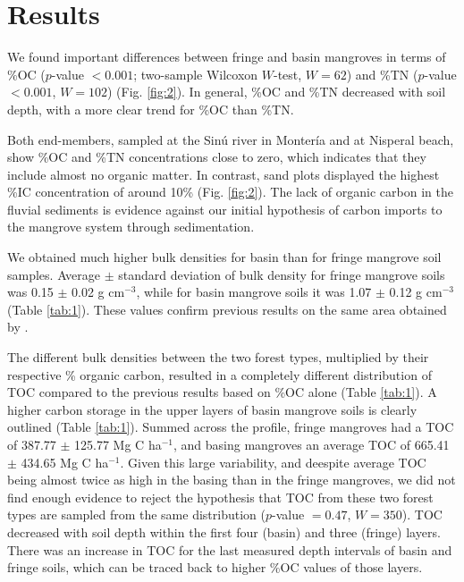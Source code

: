\section{Results}

We found important differences between fringe and basin mangroves in terms of \%OC ($p$-value $< 0.001$; two-sample Wilcoxon $W$-test, $W = 62$) and \%TN ($p$-value $< 0.001$, $W = 102$) (Fig. \ref{fig:2}). In general, \%OC and \%TN decreased with soil depth, with a more clear trend for \%OC than \%TN. 

Both end-members, sampled at the Sin\'{u} river in Monter\'{i}a and at Nisperal beach, show \%OC and \%TN concentrations close to zero, which indicates that they include almost no organic matter. In contrast, sand plots displayed the highest \%IC concentration of around 10\% (Fig. \ref{fig:2}). The lack of organic carbon in the fluvial sediments is evidence against our initial hypothesis of carbon imports to the mangrove system through sedimentation. 

We obtained much higher bulk densities for basin than for fringe mangrove soil samples. Average $\pm$ standard deviation of bulk density for fringe mangrove soils was 0.15 $\pm$ 0.02 g cm$^{-3}$, while for basin mangrove soils it was 1.07 $\pm$ 0.12 g cm$^{-3}$ (Table \ref{tab:1}). These values confirm previous results on the same area obtained by \citet{Bolivar2015}.

The different bulk densities between the two forest types, multiplied by their respective \% organic carbon, resulted in a completely different distribution of TOC compared to the previous results based on \%OC alone (Table \ref{tab:1}). A higher carbon storage in the upper layers of basin mangrove soils is clearly outlined (Table \ref{tab:1}). Summed across the profile, fringe mangroves had a TOC of 387.77 $\pm$ 125.77 Mg C ha$^{-1}$, and basing mangroves an average TOC of 665.41 $\pm$ 434.65 Mg C ha$^{-1}$. Given this large variability, and deespite average TOC being almost twice as high in the basing than in the fringe mangroves, we did not find enough evidence to reject the hypothesis that TOC from these two forest types are sampled from the same distribution  ($p$-value $= 0.47$, $W = 350$). TOC decreased with soil depth within the first four (basin) and three (fringe) layers. There was an increase in TOC for the last measured depth intervals of basin and fringe soils, which can be traced back to higher \%OC values of those layers.


